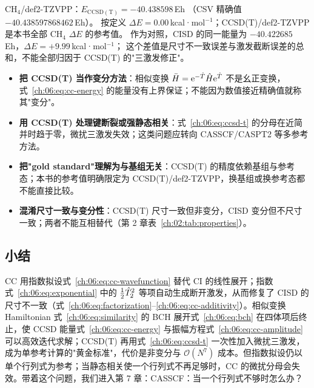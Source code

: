 \begin{ch4box}
CH$_4$/def2-TZVPP：$E_{\mathrm{CCSD(T)}} = -40.438598$\,Eh
（CSV 精确值 $-40.438597868462$\,Eh）。
按定义 $\Delta E = 0.00$\,kcal·mol$^{-1}$；CCSD(T)/def2-TZVPP 是本书全部 CH$_4$ $\Delta E$ 的参考值。
作为对照，CISD 的同一能量为 $-40.422685$\,Eh，$\Delta E = +9.99$\,kcal·mol$^{-1}$；
这个差值是尺寸不一致误差与激发截断误差的总和，不能全部归因于 CCSD(T) 的"三激发修正"。
\end{ch4box}

\begin{pitfall}
\begin{itemize}
  \item \textbf{把 CCSD(T) 当作变分方法}：相似变换 $\bar{H}=\mathrm{e}^{-\hat{T}}\hat{H}\mathrm{e}^{\hat{T}}$ 不是幺正变换，式~\eqref{ch:06:eq:cc-energy} 的能量没有上界保证；不能因为数值接近精确值就称其"变分"。
  \item \textbf{用 CCSD(T) 处理键断裂或强静态相关}：式~\eqref{ch:06:eq:ccsd-t} 的分母在近简并时趋于零，微扰三激发失效；这类问题应转向 CASSCF/CASPT2 等多参考方法。
  \item \textbf{把"gold standard"理解为与基组无关}：CCSD(T) 的精度依赖基组与参考态；本书的参考值明确限定为 CCSD(T)/def2-TZVPP，换基组或换参考态都不能直接比较。
  \item \textbf{混淆尺寸一致与变分性}：CCSD(T) 尺寸一致但非变分，CISD 变分但不尺寸一致；两者不能互相替代（第 2 章表~\ref{ch:02:tab:properties}）。
\end{itemize}
\end{pitfall}

\subsection*{小结}
CC 用指数拟设式~\eqref{ch:06:eq:cc-wavefunction} 替代 CI 的线性展开；指数式~\eqref{ch:06:eq:exponential} 中的 $\frac12\hat{T}_2^2$ 等项自动生成断开激发，从而修复了 CISD 的尺寸不一致（式~\eqref{ch:06:eq:factorization}--\eqref{ch:06:eq:cc-additivity}）。相似变换 Hamiltonian 式~\eqref{ch:06:eq:similarity} 的 BCH 展开式~\eqref{ch:06:eq:bch} 在四体项后终止，使 CCSD 能量式~\eqref{ch:06:eq:cc-energy} 与振幅方程式~\eqref{ch:06:eq:cc-amplitude} 可以高效迭代求解；CCSD(T) 再用式~\eqref{ch:06:eq:ccsd-t} 一次性加入微扰三激发，成为单参考计算的"黄金标准"，代价是非变分与 $\mathcal{O}(N^7)$ 成本。但指数拟设仍以单个行列式为参考；当静态相关使一个行列式不再足够时，CC 的微扰分母会失效。带着这个问题，我们进入第 7 章：CASSCF：当一个行列式不够时怎么办？
